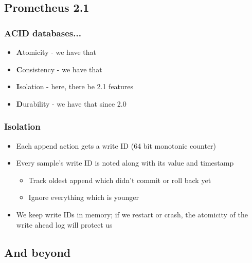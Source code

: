 \documentclass[t]{beamer}
\begin{document}
\subsection{Prometheus 2.1}

\begin{frame}
	\frametitle{ACID databases...}
	\begin{itemize}
		\item \textbf{A}tomicity - we have that
		\item \textbf{C}onsistency - we have that
		\item \textbf{I}solation - here, there be 2.1 features
		\item \textbf{D}urability - we have that since 2.0
	\end{itemize}
\end{frame}

\begin{frame}
	\frametitle{Isolation}
	\begin{itemize}
		\item Each append action gets a write ID (64 bit monotonic counter)
		\item Every sample's write ID is noted along with its value and timestamp
		\begin{itemize}
			\item Track oldest append which didn't commit or roll back yet
			\item Ignore everything which is younger
		\end{itemize}
		\item We keep write IDs in memory; if we restart or crash, the atomicity of the write ahead log will protect us
	\end{itemize}
\end{frame}


\subsection{And beyond}
\end{document}
